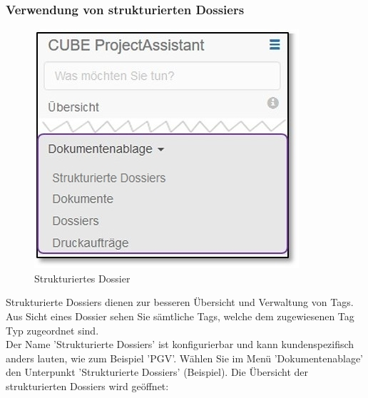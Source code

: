 
\subsubsection{Verwendung von strukturierten Dossiers}
\label{bkm:Ref2018073102}

\begin{figure}
  \vspace{-20pt}
  \begin{center}
    \includegraphics[width=1\linewidth]{../chapters/11_Dokumentenablage/pictures/11_Menu_Dokumentenablage_s.jpg}
  \end{center}
  \vspace{-20pt}
  \caption{Strukturiertes Dossier}
  \vspace{-10pt}
\end{figure}

Strukturierte Dossiers dienen zur besseren Übersicht und Verwaltung von Tags. Aus Sicht eines Dossier sehen Sie sämtliche Tags, welche dem zugewiesenen Tag Typ zugeordnet sind.\\

Der Name 'Strukturierte Dossiers' ist konfigurierbar und kann kundenspezifisch anders lauten, wie zum Beispiel 'PGV'. Wählen Sie im Menü 'Dokumentenablage' den Unterpunkt 'Strukturierte Dossiers' (Beispiel). Die Übersicht der strukturierten Dossiers wird geöffnet:

